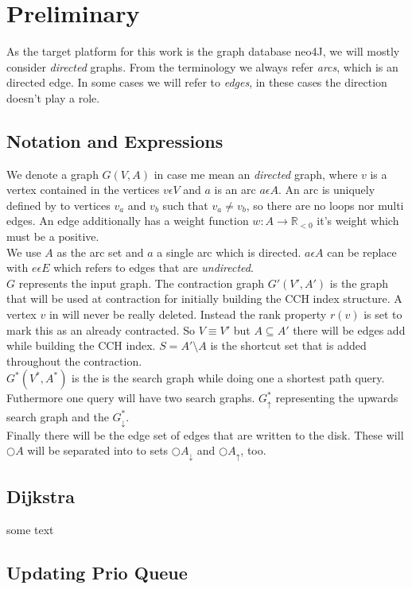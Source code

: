 \chapter{Preliminary}

As the target platform for this work is the graph database neo4J, we will mostly consider \textit{directed} graphs. From the terminology we always refer \textit{arcs}, which is an directed edge.
In some cases we will refer to \textit{edges}, in these cases the direction doesn't play a role.

\section{Notation and Expressions}
We denote a graph $G(V, A)$ in case me mean an \textit{directed} graph, where $v$ is a vertex contained in the vertices $v \epsilon  V$ and $a$ is an
arc $a \epsilon A$. An arc is uniquely defined by to vertices $v_a$ and $v_b$ such that $v_a \neq v_b$, so there are no loops nor multi edges.
An edge additionally has a weight function $w: A \rightarrow \mathbb{R}_{<0} $ it's weight which must be a positive.
\\
We use $A$ as the arc set and $a$ a single arc which is directed. $a \epsilon A$ can be replace with $e \epsilon E$ which refers to edges that are \textit{undirected}. 
\\
$G$ represents the input graph. The contraction graph $G'(V', A')$ is the graph that will be used at contraction for initially building the CCH index structure. A vertex $v$ in will 
never be really deleted. Instead the rank property $r(v)$ is set to mark this as an already contracted. So $V \equiv V'$ but $A \subseteq A'$ there will be edges add while building
the CCH index. $S = A' \setminus A$ is the shortcut set that is added throughout the contraction. 
\\
$G^*(V^*, A^*)$ is the is the search graph while doing one a shortest path query. Futhermore one query will have two search graphs. $G^*_\uparrow$ representing the upwards search graph
and the $G^*_\downarrow$.
\\
Finally there will be the edge set of edges that are written to the disk. These will $\bigcirc A$ will be separated into to sets $\bigcirc A_\downarrow$ and $\bigcirc A_\uparrow $, too.


\section{Dijkstra}

some text


\section{Updating Prio Queue}
